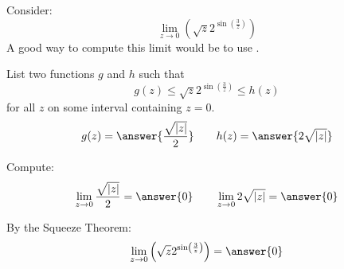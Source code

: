 \documentclass{ximera}
\author{Bart Snapp}
\begin{document}
\begin{exercise}


Consider:
\[
\lim_{z\to 0} \left(\sqrt{z} 2^{\sin \left(\frac{3}{z}\right)}\right)
\]
A good way to compute this limit would be to use .
\begin{exercise}
List two functions $g$ and $h$ such that
\[
g(z)\le \sqrt{z} 2^{\sin \left(\frac{3}{z}\right)} \le h(z)
\]
for all $z$ on some interval containing $z=0$.
\[
g(z)=\answer{\frac{\sqrt{\left| z\right| }}{2}}\qquad h(z) =\answer{2 \sqrt{\left| z\right| }}
\]
\begin{exercise}
Compute:
\[
\lim_{z \to 0}\frac{\sqrt{\left| z\right| }}{2} = \answer{0}\qquad \lim_{z\to 0}2 \sqrt{\left| z\right| } = \answer{0}
\]
\begin{exercise}
By the Squeeze Theorem:
\[
\lim_{z\to 0} \left(\sqrt{z} 2^{\sin \left(\frac{3}{z}\right)}\right) = \answer{0}
\]
\end{exercise}
\end{exercise}
\end{exercise}
\end{exercise}
\end{document}
